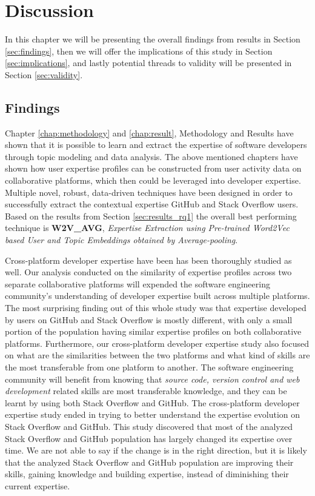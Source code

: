 \chapter{Discussion\label{chap:discussion}}

    In this chapter we will be presenting the overall findings from results in Section \ref{sec:findings}, then we will offer the implications of this study in Section \ref{sec:implications}, and lastly potential threads to validity will be presented in Section \ref{sec:validity}.
    
    \section{Findings\label{sec:findings}}
        Chapter \ref{chap:methodology} and \ref{chap:result}, Methodology and Results have shown that it is possible to learn and extract the expertise of software developers through topic modeling and data analysis. The above mentioned chapters have shown how user expertise profiles can be constructed from user activity data on collaborative platforms, which then could be leveraged into developer expertise. Multiple novel, robust, data-driven techniques have been designed in order to successfully extract the contextual expertise GitHub and Stack Overflow users. Based on the results from Section \ref{sec:results_rq1} the overall best performing technique is \textbf{W2V\_AVG}, \emph{Expertise Extraction using Pre-trained Word2Vec based User and Topic Embeddings obtained by Average-pooling}. 
        
        Cross-platform developer expertise have been has been thoroughly studied as well. Our analysis conducted on the similarity of expertise profiles across two separate collaborative platforms will expended the software engineering community's understanding of developer expertise built across multiple platforms. The most surprising finding out of this whole study was that expertise developed by users on GitHub and Stack Overflow is mostly different, with only a small portion of the population having similar expertise profiles on both collaborative platforms. Furthermore, our cross-platform developer expertise study also focused on what are the similarities between the two platforms and what kind of skills are the most transferable from one platform to another. The software engineering community will benefit from knowing that \emph{source code, version control and web development} related skills are most transferable knowledge, and they can be learnt by using both Stack Overflow and GitHub. The cross-platform developer expertise study ended in trying to better understand the expertise evolution on Stack Overflow and GitHub. This study discovered that most of the analyzed Stack Overflow and GitHub population has largely changed its expertise over time. We are not able to say if the change is in the right direction, but it is likely that the analyzed Stack Overflow and GitHub population are improving their skills, gaining knowledge and building expertise, instead of diminishing their current expertise.
        
